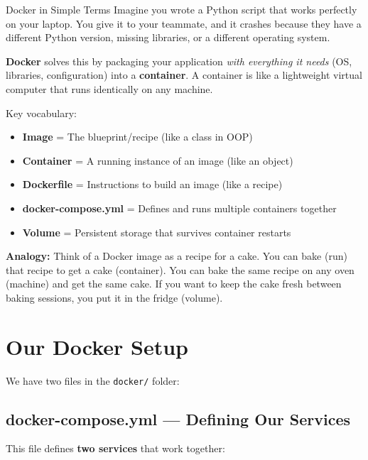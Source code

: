 \documentclass[12pt, a4paper, oneside]{report}
\begin{document}
\begin{conceptbox}{Docker in Simple Terms}
Imagine you wrote a Python script that works perfectly on your laptop. You give it to your teammate, and it crashes because they have a different Python version, missing libraries, or a different operating system.

\textbf{Docker} solves this by packaging your application \textit{with everything it needs} (OS, libraries, configuration) into a \textbf{container}. A container is like a lightweight virtual computer that runs identically on any machine.

Key vocabulary:
\begin{itemize}
    \item \textbf{Image} = The blueprint/recipe (like a class in OOP)
    \item \textbf{Container} = A running instance of an image (like an object)
    \item \textbf{Dockerfile} = Instructions to build an image (like a recipe)
    \item \textbf{docker-compose.yml} = Defines and runs multiple containers together
    \item \textbf{Volume} = Persistent storage that survives container restarts
\end{itemize}

\textbf{Analogy:} Think of a Docker image as a recipe for a cake. You can bake (run) that recipe to get a cake (container). You can bake the same recipe on any oven (machine) and get the same cake. If you want to keep the cake fresh between baking sessions, you put it in the fridge (volume).
\end{conceptbox}

\section{Our Docker Setup}

We have two files in the \texttt{docker/} folder:

\subsection{docker-compose.yml --- Defining Our Services}

This file defines \textbf{two services} that work together:
\end{document}
